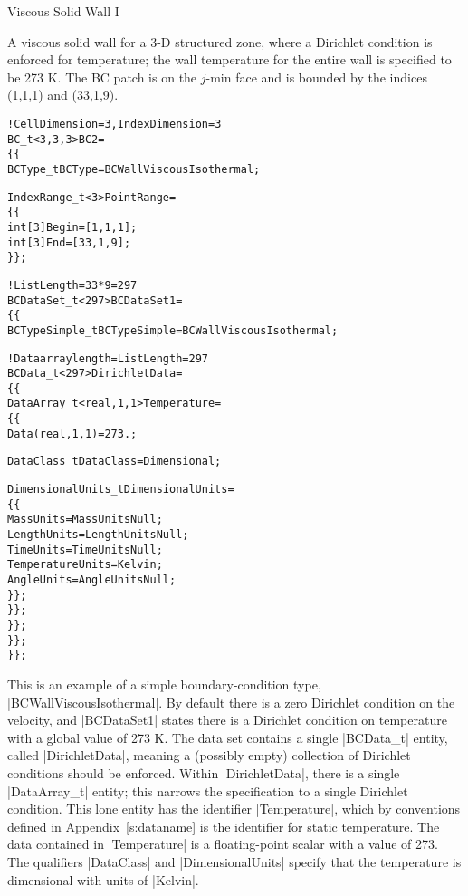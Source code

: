 \begin{example}{Viscous Solid Wall I}
\label{ex:bc2}

A viscous solid wall for a 3-D structured zone, where a Dirichlet
condition is enforced for temperature; the wall temperature for the
entire wall is specified to be 273 K.
The BC patch is on the $j$-min face and is bounded by the indices
(1,1,1) and (33,1,9).
\begin{alltt}
  !  CellDimension = 3, IndexDimension = 3
  BC\_t<3,3,3> BC2 =
    \{\{
    BCType\_t BCType = BCWallViscousIsothermal ;

    IndexRange\_t<3> PointRange =
      \{\{
      int[3] Begin = [1 ,1,1] ;
      int[3] End   = [33,1,9] ;
      \}\} ;

    !  ListLength = 33*9 = 297
    BCDataSet\_t<297> BCDataSet1 =
      \{\{
      BCTypeSimple\_t BCTypeSimple = BCWallViscousIsothermal ;

      !  Data array length = ListLength = 297
      BCData\_t<297> DirichletData =
        \{\{
        DataArray\_t<real, 1, 1> Temperature =
          \{\{
          Data(real, 1, 1) = 273. ;
          
          DataClass\_t DataClass = Dimensional ;

          DimensionalUnits\_t DimensionalUnits = 
            \{\{
            MassUnits        = MassUnitsNull ;
            LengthUnits      = LengthUnitsNull ;
            TimeUnits        = TimeUnitsNull ;
            TemperatureUnits = Kelvin ;
            AngleUnits       = AngleUnitsNull ;
            \}\} ;
          \}\} ;
        \}\} ;
      \}\} ;
    \}\} ;
\end{alltt}

This is an example of a simple boundary-condition type,
|BCWallViscousIsothermal|.
By default there is a zero Dirichlet condition on the velocity, and
|BCDataSet1| states there is a Dirichlet condition on temperature with a
global value of 273 K.
The data set contains a single |BCData_t| entity, called
|DirichletData|, meaning a (possibly empty) collection of Dirichlet
conditions should be enforced.
Within |DirichletData|, there is a single |DataArray_t| entity; this
narrows the specification to a single Dirichlet condition.
This lone entity has the identifier |Temperature|, which by conventions
defined in \hyperref[s:dataname]{Appendix~\ref*{s:dataname}} is the
identifier for static temperature.
The data contained in |Temperature| is a floating-point scalar with a
value of 273.
The qualifiers |DataClass| and |DimensionalUnits| specify that the
temperature is dimensional with units of |Kelvin|.


\end{example}

